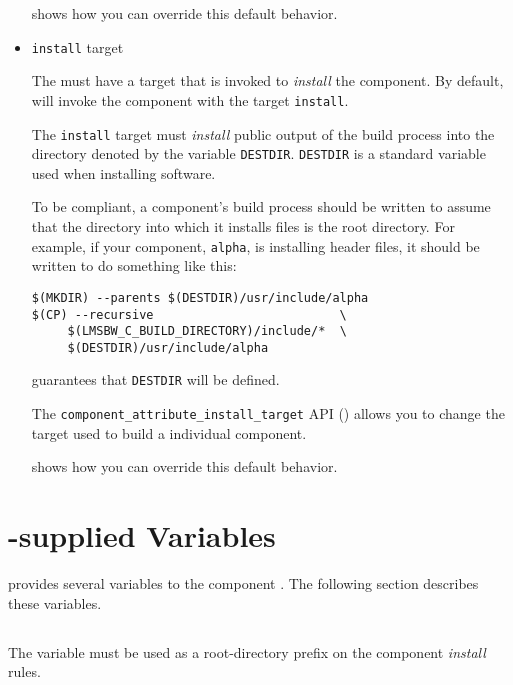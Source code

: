 \begin{itemize}
   shows how you can override this
  default behavior.

\item \texttt{install} target

  The \makefile must have a target that is invoked to \emph{install}
  the component.  By default, \lmsbw will invoke the component
  \makefile with the target \texttt{install}.

  The \texttt{install} target must \emph{install} public output of the
  build process into the directory denoted by the \makefile variable
  \texttt{DESTDIR}.  \texttt{DESTDIR} is a standard \make variable
  used when installing software.

  To be compliant, a component's build process should be written to
  assume that the directory into which it installs files is the root
  directory.  For example, if your component, \texttt{alpha}, is
  installing header files, it should be written to do something like
  this:

\begin{verbatim}
$(MKDIR) --parents $(DESTDIR)/usr/include/alpha
$(CP) --recursive                          \
     $(LMSBW_C_BUILD_DIRECTORY)/include/*  \
     $(DESTDIR)/usr/include/alpha
\end{verbatim}

  \lmsbw guarantees that \texttt{DESTDIR} will be defined.

  The \texttt{component\_attribute\_install\_target} API
  () allows you to change
  the target used to build a individual component.

   shows how you can override this
  default behavior.

\end{itemize}

\section{\lmsbw-supplied Variables}

\lmsbw provides several variables to the component \makefile.  The
following section describes these variables.

\subsection{\destdir}

The \destdir variable must be used as a root-directory prefix on the
component \emph{install} rules.

